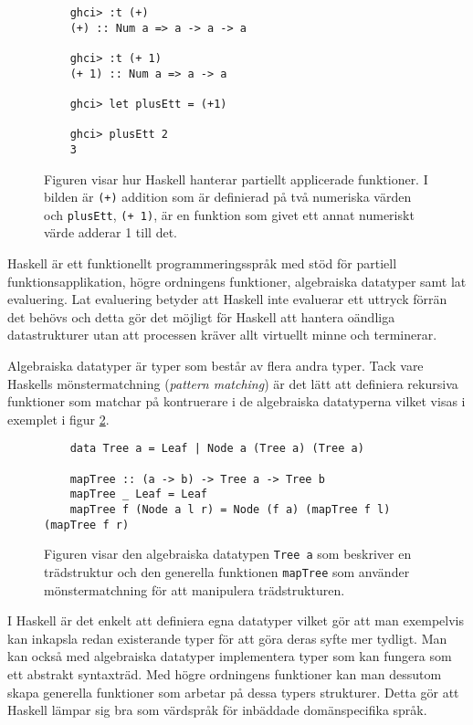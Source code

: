 \documentclass[12pt,a4paper,twoside,openright]{article}
\begin{document}
\begin{figure}[H]
  \begin{verbatim}
    ghci> :t (+)
    (+) :: Num a => a -> a -> a

    ghci> :t (+ 1)
    (+ 1) :: Num a => a -> a

    ghci> let plusEtt = (+1)

    ghci> plusEtt 2
    3
  \end{verbatim}
  \caption{Figuren visar hur Haskell hanterar partiellt applicerade
    funktioner. I bilden är \texttt{(+)} addition som är
    definierad på två numeriska värden och
    \texttt{plusEtt}, \texttt{(+ 1)}, är en
    funktion som givet ett annat numeriskt värde adderar 1 till det.}
  \label{fig:hask_partfunapp}
\end{figure}

Haskell är ett funktionellt programmeringsspråk med stöd för partiell
funktionsapplikation, högre ordningens funktioner, algebraiska
datatyper samt lat evaluering. Lat evaluering betyder att Haskell inte
evaluerar ett uttryck förrän det behövs och detta gör det möjligt för
Haskell att hantera oändliga datastrukturer utan att processen kräver
allt virtuellt minne och terminerar.

Algebraiska datatyper är typer som består av flera andra typer. Tack
vare Haskells mönstermatchning (\textit{pattern matching}) är det lätt
att definiera rekursiva funktioner som matchar på kontruerare i de
algebraiska datatyperna vilket visas i exemplet i figur
\ref{fig:hask_alg_type}.

\begin{figure}[H]
  \begin{verbatim}
    data Tree a = Leaf | Node a (Tree a) (Tree a)

    mapTree :: (a -> b) -> Tree a -> Tree b
    mapTree _ Leaf = Leaf
    mapTree f (Node a l r) = Node (f a) (mapTree f l) (mapTree f r)
  \end{verbatim}
  \caption{Figuren visar den algebraiska datatypen
    \texttt{Tree a} som beskriver en trädstruktur och den
    generella funktionen \texttt{mapTree} som använder
    mönstermatchning för att manipulera trädstrukturen.}
  \label{fig:hask_alg_type}
\end{figure}

I Haskell är det enkelt att definiera egna datatyper vilket gör att
man exempelvis kan inkapsla redan existerande typer för att göra deras
syfte mer tydligt. Man kan också med algebraiska datatyper
implementera typer som kan fungera som ett abstrakt syntaxträd. Med
högre ordningens funktioner kan man dessutom skapa generella
funktioner som arbetar på dessa typers strukturer. Detta gör att
Haskell lämpar sig bra som värdspråk för inbäddade domänspecifika
språk.
\end{document}
